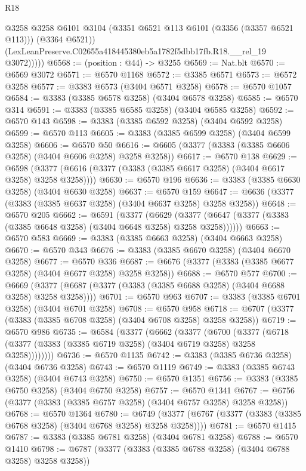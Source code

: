 \begin{lexlean}{R18}
\begin{coremodule}
              @3258
              @3258
              @6101
              @3104
              (@3351 @6521 @113 @6101 (@3356 (@3357 @6521 @113)))
              (@3364 @6521))
            (LexLeanPreserve.C02655a418445380eb5a1782f5dbb17fb.R18.__rel_19 @3072)))))
@6568 := (position : @44) -> @3255
@6569 := Nat.blt
@6570 := @6569 @3072
@6571 := @6570 @1168
@6572 := @3385 @6571
@6573 := @6572 @3258
@6577 := @3383 @6573 (@3404 @6571 @3258)
@6578 := @6570 @1057
@6584 := @3383 (@3385 @6578 @3258) (@3404 @6578 @3258)
@6585 := @6570 @314
@6591 := @3383 (@3385 @6585 @3258) (@3404 @6585 @3258)
@6592 := @6570 @143
@6598 := @3383 (@3385 @6592 @3258) (@3404 @6592 @3258)
@6599 := @6570 @113
@6605 := @3383 (@3385 @6599 @3258) (@3404 @6599 @3258)
@6606 := @6570 @50
@6616 := @6605 (@3377 (@3383 (@3385 @6606 @3258) (@3404 @6606 @3258) @3258 @3258))
@6617 := @6570 @138
@6629 := @6598 (@3377 (@6616 (@3377 (@3383 (@3385 @6617 @3258) (@3404 @6617 @3258) @3258 @3258))))
@6630 := @6570 @196
@6636 := @3383 (@3385 @6630 @3258) (@3404 @6630 @3258)
@6637 := @6570 @159
@6647 := @6636 (@3377 (@3383 (@3385 @6637 @3258) (@3404 @6637 @3258) @3258 @3258))
@6648 := @6570 @205
@6662 := @6591
    (@3377
      (@6629 (@3377 (@6647 (@3377 (@3383 (@3385 @6648 @3258) (@3404 @6648 @3258) @3258 @3258))))))
@6663 := @6570 @583
@6669 := @3383 (@3385 @6663 @3258) (@3404 @6663 @3258)
@6670 := @6570 @343
@6676 := @3383 (@3385 @6670 @3258) (@3404 @6670 @3258)
@6677 := @6570 @336
@6687 := @6676 (@3377 (@3383 (@3385 @6677 @3258) (@3404 @6677 @3258) @3258 @3258))
@6688 := @6570 @577
@6700 := @6669 (@3377 (@6687 (@3377 (@3383 (@3385 @6688 @3258) (@3404 @6688 @3258) @3258 @3258))))
@6701 := @6570 @963
@6707 := @3383 (@3385 @6701 @3258) (@3404 @6701 @3258)
@6708 := @6570 @958
@6718 := @6707 (@3377 (@3383 (@3385 @6708 @3258) (@3404 @6708 @3258) @3258 @3258))
@6719 := @6570 @986
@6735 := @6584
    (@3377
      (@6662
        (@3377
          (@6700
            (@3377 (@6718 (@3377 (@3383 (@3385 @6719 @3258) (@3404 @6719 @3258) @3258 @3258))))))))
@6736 := @6570 @1135
@6742 := @3383 (@3385 @6736 @3258) (@3404 @6736 @3258)
@6743 := @6570 @1119
@6749 := @3383 (@3385 @6743 @3258) (@3404 @6743 @3258)
@6750 := @6570 @1351
@6756 := @3383 (@3385 @6750 @3258) (@3404 @6750 @3258)
@6757 := @6570 @1341
@6767 := @6756 (@3377 (@3383 (@3385 @6757 @3258) (@3404 @6757 @3258) @3258 @3258))
@6768 := @6570 @1364
@6780 := @6749 (@3377 (@6767 (@3377 (@3383 (@3385 @6768 @3258) (@3404 @6768 @3258) @3258 @3258))))
@6781 := @6570 @1415
@6787 := @3383 (@3385 @6781 @3258) (@3404 @6781 @3258)
@6788 := @6570 @1410
@6798 := @6787 (@3377 (@3383 (@3385 @6788 @3258) (@3404 @6788 @3258) @3258 @3258))

\end{coremodule}
\end{lexlean}
